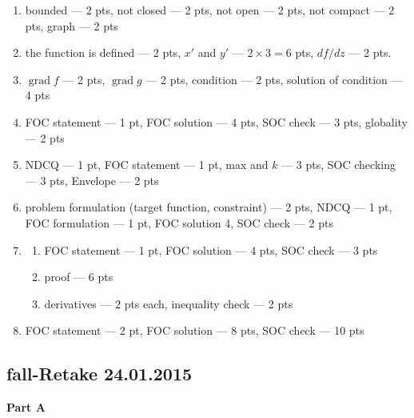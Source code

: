 \documentclass[12pt]{article} %
\theoremstyle{definition} %
\DeclareMathOperator{\grad}{grad}
\providecommand{\grad}{\mathrm{grad}\,}
\begin{document}
\begin{enumerate}
\item bounded --- 2 pts, not closed --- 2 pts, not open --- 2 pts, not compact --- 2 pts, graph --- 2 pts
\item the function is defined --- 2 pts, $x'$ and $y'$ --- $2\times 3=6$ pts, $df/dz$ --- 2 pts.
\item $\grad f$ --- 2 pts, $\grad g$ --- 2 pts, condition --- 2 pts, solution of condition --- 4 pts
\item FOC statement --- 1 pt, FOC solution --- 4 pts, SOC check --- 3 pts, globality --- 2 pts
\item NDCQ --- 1 pt, FOC statement --- 1 pt, max and $k$ --- 3 pts, SOC checking --- 3 pts, Envelope  --- 2 pts
\item problem formulation (target function, constraint) --- 2 pts, NDCQ --- 1 pt, FOC formulation --- 1 pt, FOC solution 4, SOC check --- 2 pts
\item
\begin{enumerate}
\item FOC statement --- 1 pt, FOC solution --- 4 pts, SOC check --- 3 pts
\item proof --- 6 pts
\item derivatives --- 2 pts each, inequality check --- 2 pts
\end{enumerate}
\item FOC statement --- 2 pt, FOC solution --- 8 pts, SOC check --- 10 pts
\end{enumerate}


\subsection{fall-Retake 24.01.2015}

\textbf{Part A}
\end{document}
